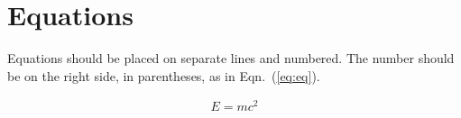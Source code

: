 \section{Equations}\label{sec:equations}

Equations should be placed on separate lines and numbered.
The number should be on the right side, in parentheses,
as in Eqn.~(\ref{eq:eq}).

\begin{align}\label{eq:eq}
E = mc^2
\end{align}
